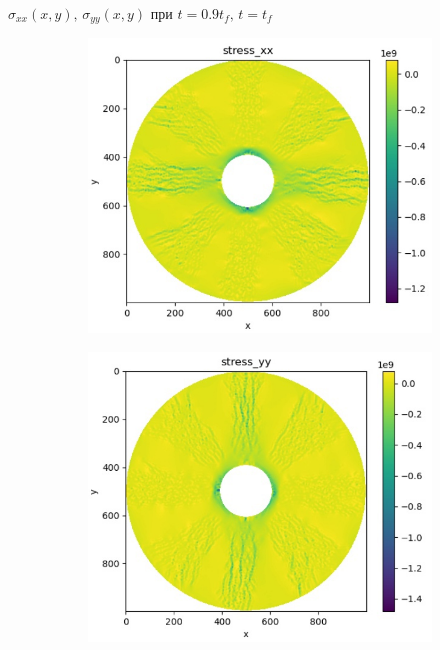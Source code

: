 \documentclass{beamer}
\begin{document}
\begin{frame}{$\sigma_{xx}(x,y),\,\sigma_{yy}(x,y)$ при $t = 0.9t_f,\,t=t_f$}
\begin{figure}[H]
\begin{subfigure}[H]{0.4\textwidth}
		\end{subfigure}	
		\begin{subfigure}[H]{0.4\textwidth}
		\includegraphics[width=\textwidth]{stressx_tf}
	\end{subfigure}
	\qquad\qquad
	\begin{subfigure}[H]{0.4\textwidth}
		\includegraphics[width=\textwidth]{stressy_tf}
	\end{subfigure}	
	\end{figure}	
\end{frame}
\end{document}

